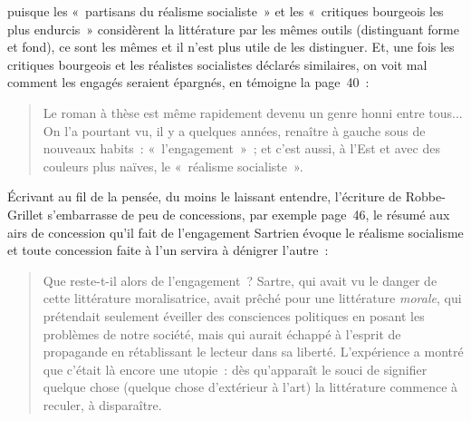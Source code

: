 puisque les «~partisans du réalisme socialiste~» et les «~critiques bourgeois les plus endurcis~» considèrent la littérature par les mêmes outils (distinguant forme et fond), ce sont les mêmes et il n'est plus utile de les distinguer. Et, une fois les critiques bourgeois et les réalistes socialistes déclarés similaires, on voit mal comment les engagés seraient épargnés, en témoigne la page~40~:
\begin{quote}
    Le roman à thèse est même rapidement devenu un genre honni entre tous... On l’a pourtant vu, il y a quelques années, renaître à gauche sous de nouveaux habits~: «~l’engagement~»~; et c’est aussi, à l’Est et avec des couleurs plus naïves, le «~réalisme socialiste~».
\end{quote}

Écrivant au fil de la pensée, du moins le laissant entendre, l'écriture de Robbe-Grillet s'embarrasse de peu de concessions, par exemple page~46, le résumé aux airs de concession qu'il fait de l'engagement Sartrien évoque le réalisme socialisme et toute concession faite à l'un servira à dénigrer l'autre~:
\begin{quote}
    Que reste-t-il alors de l’engagement~? Sartre, qui avait vu le danger de cette littérature moralisatrice, avait prêché pour une littérature \textit{morale}, qui prétendait seulement éveiller des consciences politiques en posant les problèmes de notre société, mais qui aurait échappé à l’esprit de propagande en rétablissant le lecteur dans sa liberté. L’expérience a montré que c’était là encore une utopie~: dès qu’apparaît le souci de signifier quelque chose (quelque chose d’extérieur à l’art) la littérature commence à reculer, à disparaître.
\end{quote}



